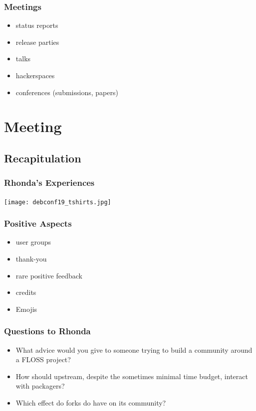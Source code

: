 \begin{frame}[<+-| alert@+>]
	\frametitle{Meetings}

	\begin{itemize}
		\item status reports
		\item release parties
		\item talks
		\item hackerspaces
		\item conferences (submissions, papers)
	\end{itemize}
\end{frame}



\section{Meeting}

\subsection{Recapitulation}


\begin{frame}
	\frametitle{Rhonda's Experiences}

	\texttt{[image: debconf19\_tshirts.jpg]}
\end{frame}

\begin{frame}
	\frametitle{Positive Aspects}

	\pause

	\begin{itemize}[<+-| alert@+>]
		\item user groups
		\item thank-you
		\item rare positive feedback
		\item credits
		\item Emojis
	\end{itemize}
\end{frame}

\begin{frame}
	\frametitle{Questions to Rhonda}

	\begin{itemize}[<+-| alert@+>]
		\item What advice would you give to someone trying to build a community around a FLOSS project?
		\item How should upstream, despite the sometimes minimal time budget, interact with packagers?
		\item Which effect do forks do have on its community?
	\end{itemize}
\end{frame}

